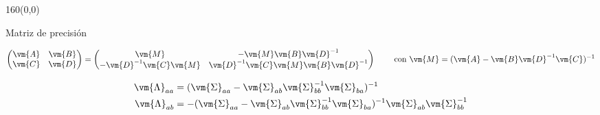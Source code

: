 \documentclass[shownotes,aspectratio=169]{beamer}
\begin{document}
\begin{frame}[plain]
 \begin{textblock}{160}(0,0)
\begin{center}
 \large Matriz de precisi\'on
\end{center}
\end{textblock}
\vspace{0.75cm}

\begin{align*}
 \begin{pmatrix} \vm{A} & \vm{B} \\ \vm{C} & \vm{D} \end{pmatrix}  
 = 
 \begin{pmatrix} 
 \vm{M} &  -\vm{M}\vm{B}\vm{D}^{-1}  \\
 -\vm{D}^{-1}\vm{C}\vm{M}  & \vm{D}^{-1} \vm{C}\vm{M}\vm{B}\vm{D}^{-1} 
 \end{pmatrix}
 \hspace{0.8cm} \text{con } \vm{M} = (\vm{A}-\vm{B}\vm{D}^{-1}\vm{C})^{-1} 
\end{align*}


\begin{align*}
 \vm{\Lambda}_{aa} & = ( \vm{\Sigma}_{aa} - \vm{\Sigma}_{ab} \vm{\Sigma}_{bb}^{-1} \vm{\Sigma}_{ba} )^{-1} \\
 \vm{\Lambda}_{ab} & = -( \vm{\Sigma}_{aa} - \vm{\Sigma}_{ab} \vm{\Sigma}_{bb}^{-1} \vm{\Sigma}_{ba} )^{-1}  \vm{\Sigma}_{ab}  \vm{\Sigma}_{bb}^{-1}
\end{align*}

% 

\end{frame}
\end{document}
